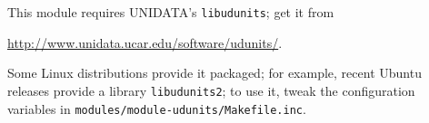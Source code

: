 This module requires UNIDATA's \texttt{libudunits}; get it from
\begin{center}
\url{http://www.unidata.ucar.edu/software/udunits/}.
\end{center}
Some Linux distributions provide it packaged;
for example, recent Ubuntu releases provide a library \texttt{libudunits2};
to use it, tweak the configuration variables
in \texttt{modules/module-udunits/Makefile.inc}.




